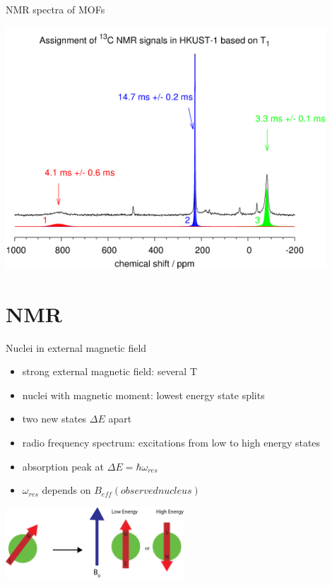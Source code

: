 \documentclass[slovene, usenames,dvipsnames]{beamer}
\begin{document}
\begin{frame}{NMR spectra of MOFs}
\begin{minipage}[]{0.6\textwidth}
  \end{minipage}%
  \begin{minipage}[]{0.4\textwidth}
    \includegraphics[width=0.9\textwidth]{hkust_spekter.png}
  \end{minipage}
  \end{frame}

\section{NMR}
\begin{frame}{Nuclei in external magnetic field}
  \begin{itemize}[]
   \item strong external magnetic field: several T
  \item nuclei with magnetic moment: lowest energy state splits
    \item two new states $\Delta E$ apart
   \item radio frequency spectrum: excitations from low to high energy states
   \item absorption peak at $\Delta E=\hbar \omega_{res}$
    \item $\omega_{res}$ depends on $B_{eff}(observed nucleus)$
    \end{itemize}
       \begin{minipage}[]{\textwidth}
      \centering
    \includegraphics[width=0.5\textwidth]{spin_energy_states.png}
\end{minipage}
\end{frame}
\end{document}
